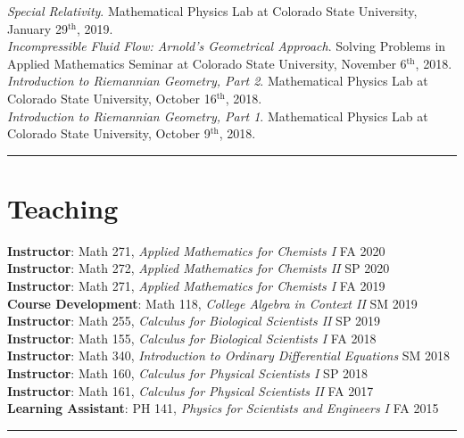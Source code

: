\documentclass[12pt]{article} %
\begin{document}
\begin{flushleft}
    \vspace*{5pt}
    \emph{Special Relativity}. Mathematical Physics Lab at Colorado State University, January 29$^\textrm{th}$, 2019.\\
    \vspace*{5pt}
    \emph{Incompressible Fluid Flow: Arnold's Geometrical Approach}. Solving Problems in Applied Mathematics Seminar at Colorado State University, November 6$^\textrm{th}$, 2018.\\
    \vspace*{5pt}
    \emph{Introduction to Riemannian Geometry, Part 2}. Mathematical Physics Lab at Colorado State University, October 16$^\textrm{th}$, 2018.\\
    \vspace*{5pt}
    \emph{Introduction to Riemannian Geometry, Part 1}. Mathematical Physics Lab at Colorado State University, October 9$^\textrm{th}$, 2018.
\end{flushleft}


\rule{\textwidth}{0.5mm}


\section{Teaching}
\begin{flushleft}
\textbf{Instructor}: Math 271, \emph{Applied Mathematics for Chemists I} \hfill FA 2020\\
\vspace*{5pt}
\textbf{Instructor}: Math 272, \emph{Applied Mathematics for Chemists II} \hfill SP 2020\\
\vspace*{5pt}
\textbf{Instructor}: Math 271, \emph{Applied Mathematics for Chemists I} \hfill FA 2019\\
\vspace*{5pt}
\textbf{Course Development}: Math 118, \emph{College Algebra in Context II} \hfill SM 2019\\
\vspace*{5pt}
\textbf{Instructor}: Math 255, \emph{Calculus for Biological Scientists II} \hfill SP 2019\\
\vspace*{5pt}
\textbf{Instructor}: Math 155, \emph{Calculus for Biological Scientists I} \hfill FA 2018\\
\vspace*{5pt}
\textbf{Instructor}: Math 340, \emph{Introduction to Ordinary Differential Equations} \hfill SM 2018\\
\vspace*{5pt}
\textbf{Instructor}: Math 160, \emph{Calculus for Physical Scientists I} \hfill SP 2018\\
\vspace*{5pt}
\textbf{Instructor}: Math 161, \emph{Calculus for Physical Scientists II} \hfill FA 2017\\
\vspace*{5pt}
\textbf{Learning Assistant}: PH 141, \emph{Physics for Scientists and Engineers I} \hfill FA 2015
\end{flushleft}
\rule{\textwidth}{0.5mm}
\end{document}
